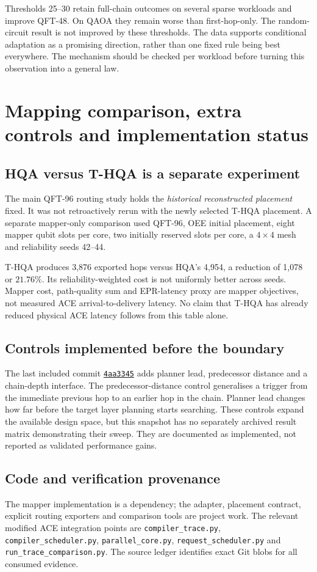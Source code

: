 \documentclass[11pt,a4paper,oneside]{report}
\newcommand{\repo}{https://github.com/sanjeevkrishnaa/Compiler-Driven-ACE}
\newcommand{\commit}[1]{\href{\repo/commit/#1}{\texttt{#1}}}
\begin{document}
Thresholds 25--30 retain full-chain outcomes on several sparse workloads and improve QFT-48. On QAOA they remain worse than first-hop-only. The random-circuit result is not improved by these thresholds. The data supports conditional adaptation as a promising direction, rather than one fixed rule being best everywhere. The mechanism should be checked per workload before turning this observation into a general law.

\chapter{Mapping comparison, extra controls and implementation status}
\section{HQA versus T-HQA is a separate experiment}
The main QFT-96 routing study holds the \emph{historical reconstructed placement} fixed. It was not retroactively rerun with the newly selected T-HQA placement. A separate mapper-only comparison used QFT-96, OEE initial placement, eight mapper qubit slots per core, two initially reserved slots per core, a $4\times4$ mesh and reliability seeds 42--44.

T-HQA produces 3,876 exported hops versus HQA's 4,954, a reduction of 1,078 or $21.76\%$. Its reliability-weighted cost is not uniformly better across seeds. Mapper cost, path-quality sum and EPR-latency proxy are mapper objectives, not measured ACE arrival-to-delivery latency. No claim that T-HQA has already reduced physical ACE latency follows from this table alone.

\section{Controls implemented before the boundary}
The last included commit \commit{4aa3345} adds planner lead, predecessor distance and a chain-depth interface. The predecessor-distance control generalises a trigger from the immediate previous hop to an earlier hop in the chain. Planner lead changes how far before the target layer planning starts searching. These controls expand the available design space, but this snapshot has no separately archived result matrix demonstrating their sweep. They are documented as implemented, not reported as validated performance gains.

\section{Code and verification provenance}
The mapper implementation is a dependency; the adapter, placement contract, explicit routing exporters and comparison tools are project work. The relevant modified ACE integration points are \texttt{compiler\_trace.py}, \texttt{compiler\_scheduler.py}, \texttt{parallel\_core.py}, \texttt{request\_scheduler.py} and \texttt{run\_trace\_comparison.py}. The source ledger identifies exact Git blobs for all consumed evidence.
\end{document}
